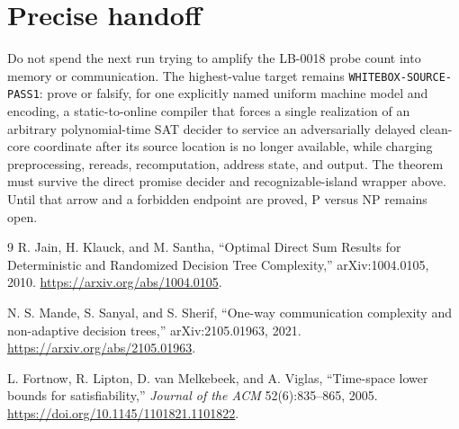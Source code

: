 \documentclass[11pt]{article}
\begin{document}
\section{Precise handoff}

Do not spend the next run trying to amplify the LB-0018 probe count into memory
or communication.  The highest-value target remains
\texttt{WHITEBOX-SOURCE-PASS1}: prove or falsify, for one explicitly named
uniform machine model and encoding, a static-to-online compiler that forces a
single realization of an arbitrary polynomial-time SAT decider to service an
adversarially delayed clean-core coordinate after its source location is no
longer available, while charging preprocessing, rereads, recomputation,
address state, and output.  The theorem must survive the direct promise
decider and recognizable-island wrapper above.  Until that arrow and a
forbidden endpoint are proved, P versus NP remains open.

\begin{thebibliography}{9}
R. Jain, H. Klauck, and M. Santha,
``Optimal Direct Sum Results for Deterministic and Randomized Decision Tree
Complexity,'' arXiv:1004.0105, 2010.
\url{https://arxiv.org/abs/1004.0105}.

N. S. Mande, S. Sanyal, and S. Sherif,
``One-way communication complexity and non-adaptive decision trees,''
arXiv:2105.01963, 2021.
\url{https://arxiv.org/abs/2105.01963}.

L. Fortnow, R. Lipton, D. van Melkebeek, and A. Viglas,
``Time-space lower bounds for satisfiability,''
\emph{Journal of the ACM} 52(6):835--865, 2005.
\url{https://doi.org/10.1145/1101821.1101822}.
\end{thebibliography}

\end{document}
